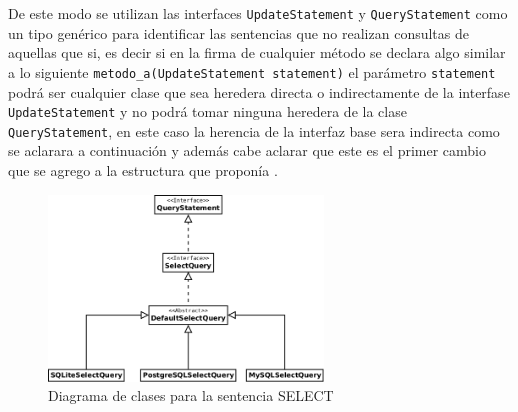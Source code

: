 De este modo se utilizan las interfaces \verb=UpdateStatement= y \verb=QueryStatement= como un tipo genérico para identificar las sentencias que no realizan consultas de aquellas que si, es decir si en la firma de cualquier método se declara algo similar a lo siguiente \verb=metodo_a(UpdateStatement statement)= el parámetro \verb=statement= podrá ser cualquier clase que sea heredera directa o indirectamente de la interfase \verb=UpdateStatement= y no podrá tomar ninguna heredera de la clase \verb=QueryStatement=, en este caso la herencia de la interfaz base sera indirecta como se aclarara a continuación y además cabe aclarar que este es el primer cambio que se agrego a la estructura que proponía \cc.
%
\begin{figure}
  \centering
    \includegraphics[width=0.65\textwidth]{figuras/crossdb-query.png}
  \caption{Diagrama de clases para la sentencia SELECT}
  \label{fig:query-base}
\end{figure}

